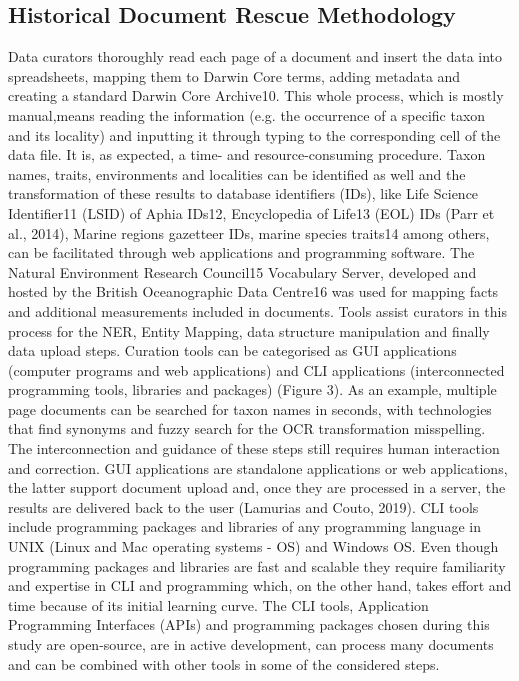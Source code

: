     \subsection{Historical Document Rescue Methodology}
    Data curators thoroughly read each page of a document and insert the data into spreadsheets, mapping them to Darwin Core terms, adding metadata and creating a standard Darwin Core Archive10. This whole process, which is mostly manual,means reading the information (e.g. the occurrence of a specific taxon and its locality) and inputting it through typing to the corresponding cell of the data file. It is, as expected, a time- and resource-consuming procedure. Taxon names, traits, environments and localities can be identified as well and the transformation of these results to database identifiers (IDs), like Life Science Identifier11 (LSID) of Aphia IDs12, Encyclopedia of Life13 (EOL) IDs (Parr et al., 2014), Marine regions gazetteer IDs, marine species traits14 among others, can be facilitated through web applications and programming software. The Natural Environment Research Council15 Vocabulary Server, developed and hosted by the British Oceanographic Data Centre16 was used for mapping facts and additional measurements included in documents.
Tools assist curators in this process for the NER, Entity Mapping, data structure manipulation and finally data upload steps. Curation tools can be categorised as GUI applications (computer programs and web applications) and CLI applications (interconnected programming tools, libraries and packages) (Figure 3). As an example, multiple page documents can be searched for taxon names in seconds, with technologies that find synonyms and fuzzy search for the OCR transformation misspelling. The interconnection and guidance of these steps still requires human interaction and correction.
GUI applications are standalone applications or web applications, the latter support document upload and, once they are processed in a server, the results are delivered back to the user (Lamurias and Couto, 2019). CLI tools include programming packages and libraries of any programming language in UNIX (Linux and Mac operating systems - OS) and Windows OS. Even though programming packages and libraries are fast and scalable they require familiarity and expertise in CLI and programming which, on the other hand, takes effort and time because of its initial learning curve. The CLI tools, Application Programming Interfaces (APIs) and programming packages chosen during this study are open-source, are in active development, can process many documents and can be combined with other tools in some of the considered steps.


